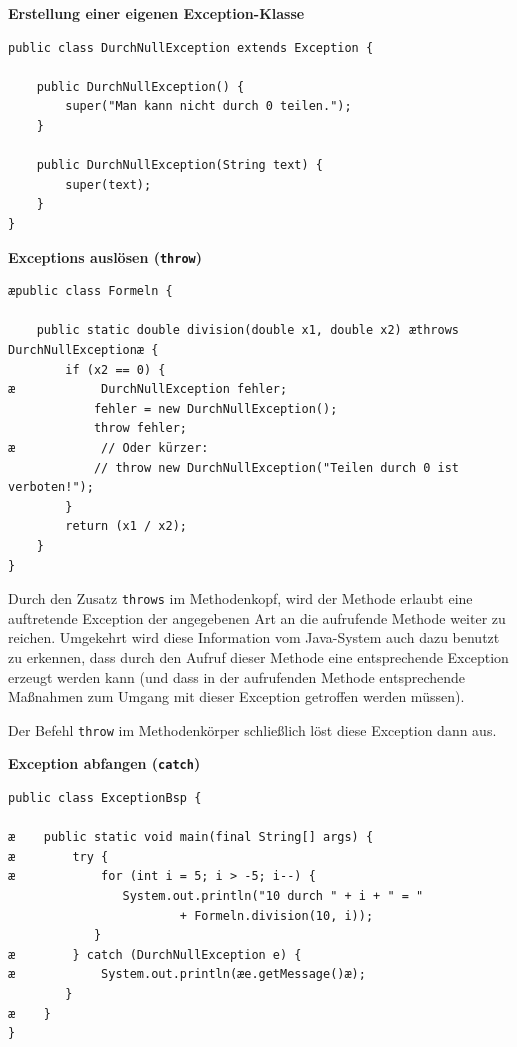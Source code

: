 \begin{compactenum}[a)]
\item \textbf{Erstellung einer eigenen Exception-Klasse}

\begin{lstlisting}
public class DurchNullException extends Exception {

    public DurchNullException() {
        super("Man kann nicht durch 0 teilen.");
    }

    public DurchNullException(String text) {
        super(text);
    }
}
\end{lstlisting}

\item \textbf{Exceptions auslösen (\lstinline|throw|)}

\begin{lstlisting}
æpublic class Formeln {

    public static double division(double x1, double x2) æthrows DurchNullExceptionæ { 
        if (x2 == 0) {
æ            DurchNullException fehler;
            fehler = new DurchNullException();
            throw fehler;
æ            // Oder kürzer:
            // throw new DurchNullException("Teilen durch 0 ist verboten!");
        }
        return (x1 / x2);
    }
}
\end{lstlisting}

Durch den Zusatz \lstinline|throws| im Methodenkopf, wird der Methode erlaubt
eine auftretende Exception der angegebenen Art an die aufrufende Methode weiter
zu reichen. Umgekehrt wird diese Information vom Java-System auch dazu benutzt
zu erkennen, dass durch den Aufruf dieser Methode eine entsprechende Exception
erzeugt werden kann (und dass in der aufrufenden Methode entsprechende
Maßnahmen zum Umgang mit dieser Exception getroffen werden müssen).

Der Befehl \lstinline|throw| im Methodenkörper schließlich löst diese Exception
dann aus.

\item \textbf{Exception abfangen (\lstinline|catch|)}

\begin{lstlisting}
public class ExceptionBsp {

æ    public static void main(final String[] args) {
æ        try {
æ            for (int i = 5; i > -5; i--) {
                System.out.println("10 durch " + i + " = "
                        + Formeln.division(10, i));
            }
æ        } catch (DurchNullException e) {
æ            System.out.println(æe.getMessage()æ);
        }
æ    }
}
\end{lstlisting}


\end{compactenum}
